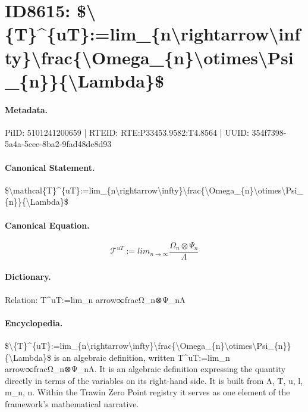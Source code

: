 \section*{ID8615: \$\textbackslash{}\{T\}\textasciicircum{}\{uT\}:=lim\_\{n\textbackslash{}rightarrow\textbackslash{}infty\}\textbackslash{}frac\{\textbackslash{}Omega\_\{n\}\textbackslash{}otimes\textbackslash{}Psi\_\{n\}\}\{\textbackslash{}Lambda\}\$}
\paragraph{Metadata.}
PiID: 5101241200659 | RTEID: RTE:P33453.9582:T4.8564 | UUID: 354f7398-5a4a-5cee-8ba2-9fad48de8d93

\paragraph{Canonical Statement.}
\$\textbackslash{}mathcal\{T\}\textasciicircum{}\{uT\}:=lim\_\{n\textbackslash{}rightarrow\textbackslash{}infty\}\textbackslash{}frac\{\textbackslash{}Omega\_\{n\}\textbackslash{}otimes\textbackslash{}Psi\_\{n\}\}\{\textbackslash{}Lambda\}\$

\paragraph{Canonical Equation.}
\[
\mathcal{T}^{uT}:=lim_{n\rightarrow\infty}\frac{\Omega_{n}\otimes\Psi_{n}}{\Lambda}
\]

\paragraph{Dictionary.}
Relation: T\textasciicircum{}uT:=lim\_n arrow∞fracΩ\_n⊗Ψ\_nΛ

\paragraph{Encyclopedia.}
\$\textbackslash{}\{T\}\textasciicircum{}\{uT\}:=lim\_\{n\textbackslash{}rightarrow\textbackslash{}infty\}\textbackslash{}frac\{\textbackslash{}Omega\_\{n\}\textbackslash{}otimes\textbackslash{}Psi\_\{n\}\}\{\textbackslash{}Lambda\}\$ is an algebraic definition, written T\textasciicircum{}uT:=lim\_n arrow∞fracΩ\_n⊗Ψ\_nΛ. It is an algebraic definition expressing the quantity directly in terms of the variables on its right-hand side. It is built from Λ, T, u, l, m\_n, n. Within the Trawin Zero Point registry it serves as one element of the framework's mathematical narrative.
